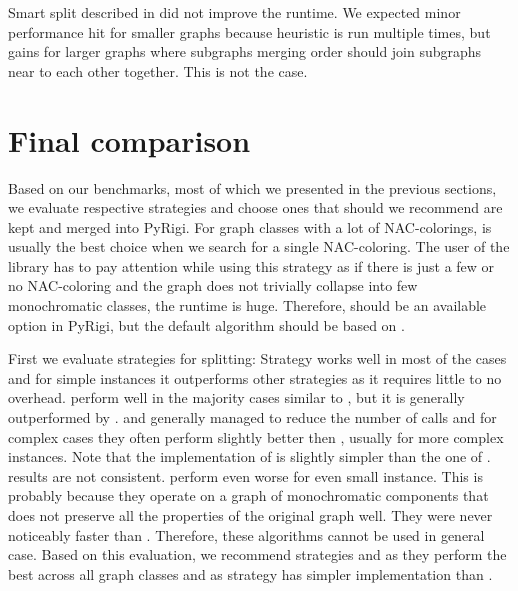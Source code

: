 Smart split described in 
did not improve the runtime.
We expected minor performance hit for smaller graphs because heuristic is run
multiple times, but gains for larger graphs where subgraphs merging order
should join subgraphs near to each other together. This is not the case.

\section{Final comparison}

Based on our benchmarks, most of which we presented in the previous sections,
we evaluate respective strategies and choose ones
that should we recommend are kept and merged into PyRigi.
%
For graph classes with a lot of NAC-colorings,
\NaiveCycles{} is usually the best choice
when we search for a single NAC-coloring.
%
The user of the library has to pay attention while using this strategy
as if there is just a few or no NAC-coloring and the graph does not trivially collapse
into few monochromatic classes, the runtime is huge.
Therefore, \NaiveCycles{} should be an available option in PyRigi,
but the default algorithm should be based on \Subgraphs{}.

First we evaluate strategies for splitting:
Strategy \None{} works well in most of the cases and for simple
instances it outperforms other strategies as it requires little to no overhead.
%
\CyclesMatchChunks{} perform well in the majority cases similar to \None{},
but it is generally outperformed by \Neighbors{}.
%
\Neighbors{} and \NeighborsDegree{} generally managed to reduce the number
of \IsNACColoring{} calls and for complex cases they often
perform slightly better then \None{}, usually for more complex instances.
Note that the implementation of \Neighbors{} is slightly simpler than
the one of \NeighborsDegree{}.
%
\KernighanLin{} results are not consistent.
\Cuts{} perform even worse for even small instance.
This is probably because they operate on a graph of monochromatic
components that does not preserve all the properties
of the original graph well.
They were never noticeably faster than \Neighbors{}.
Therefore, these algorithms cannot be used in general case.
%
Based on this evaluation, we recommend strategies \None{} and \Neighbors{}
as they perform the best across all graph classes and
as \Neighbors{} strategy has simpler implementation than \NeighborsDegree{}.

